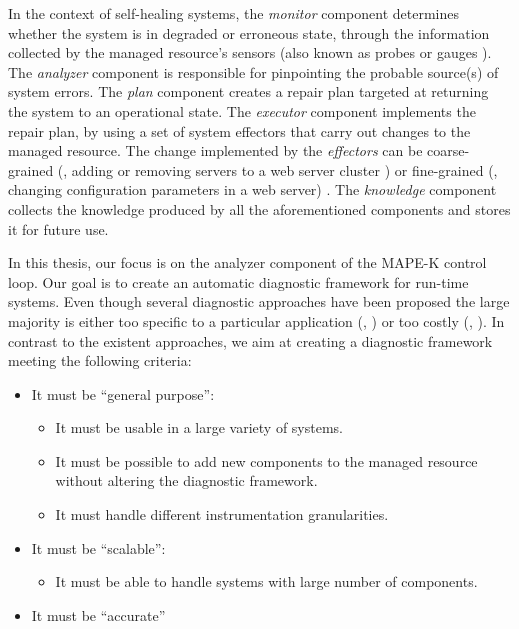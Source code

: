 In the context of self-healing systems, the \emph{monitor} component
determines whether the system is in degraded or erroneous state,
through the information collected by the managed resource's sensors
(also known as probes or gauges \cite{Garlan01}).
%
The \emph{analyzer} component is responsible for pinpointing the
probable source(s) of system errors.
%
The \emph{plan} component creates a repair plan targeted at returning
the system to an operational state.
%
The \emph{executor} component implements the repair plan, by using a set of
system effectors that carry out changes to the managed resource.
%
The change implemented by the \emph{effectors} can be coarse-grained
(\eg, adding or removing servers to a web server cluster
\cite{Garlan04}) or fine-grained (\eg, changing configuration
parameters in a web server) \cite{Bigus02}.
%
The \emph{knowledge} component collects the knowledge produced by all
the aforementioned components and stores it for future use.



In this thesis, our focus is on the analyzer component of the
\ac{MAPE-K} control loop.
%
Our goal is to create an automatic diagnostic framework for run-time
systems.
%
Even though several diagnostic approaches have been proposed the large
majority is either too specific to a particular application (\eg,
\cite{Chao04,Mohammadi07,Kasick10,Tan10,Shvachko10}) or too costly
(\eg, \cite{Reiter87,Kleer87,Mayer03,Wotawa02}).
%
In contrast to the existent approaches, we aim at creating a
diagnostic framework meeting the following criteria:
%
\begin{itemize}[nolistsep]
\item It must be ``general purpose'':
  \begin{itemize}
  \item It must be usable in a large variety of systems.
  \item It must be possible to add new components to the managed
    resource without altering the diagnostic framework.
  \item It must handle different instrumentation granularities.
  \end{itemize}

\item It must be ``scalable'':
  \begin{itemize}
  \item It must be able to handle systems with large number of
    components.
  \end{itemize}

\item It must be ``accurate''
\end{itemize}
%

